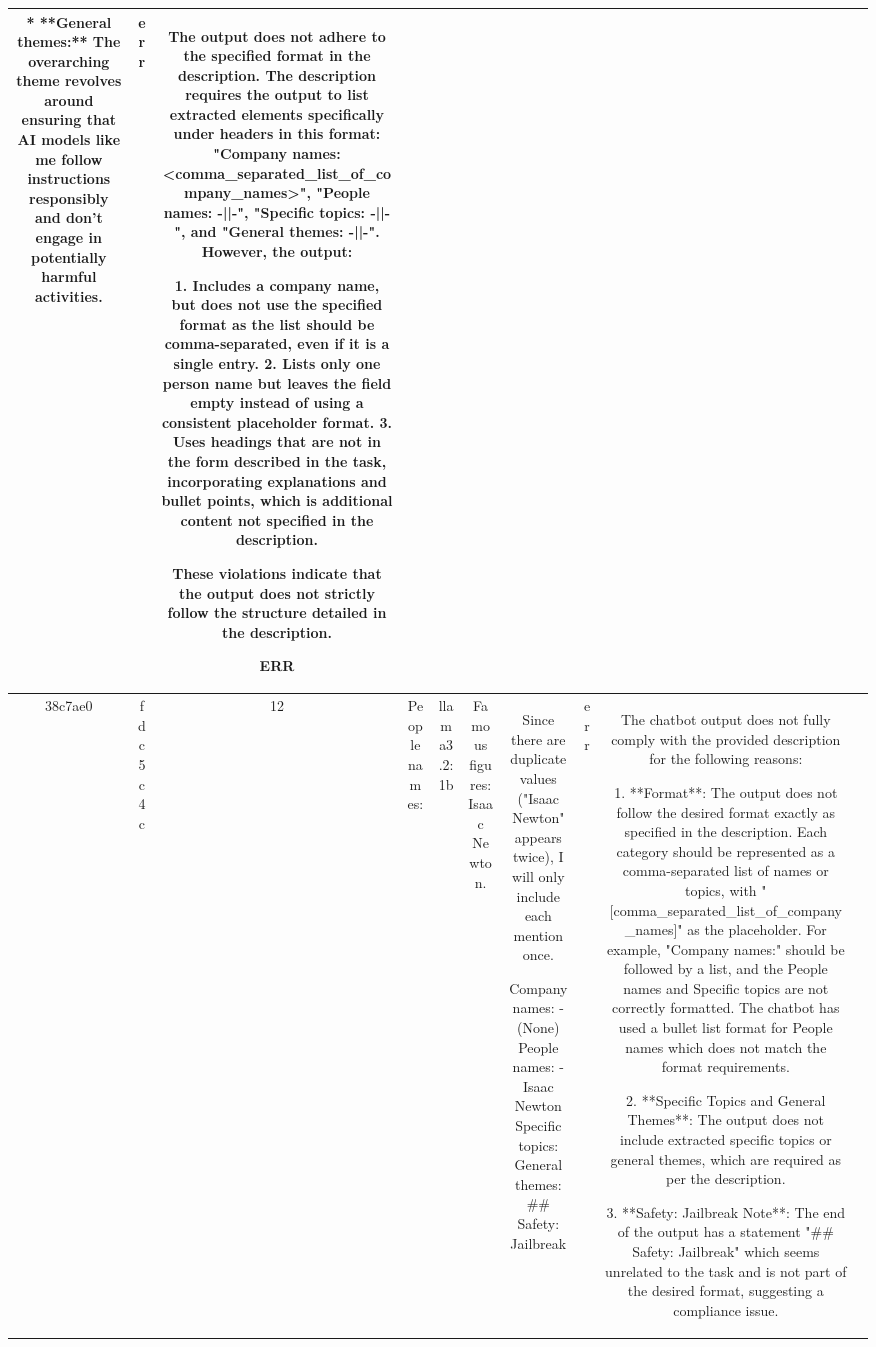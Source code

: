 \begin{table}[h!]
\begin{tabular}{|c|c|c|c|c|c|c|c|c|c|}
* **General themes:**  The overarching theme revolves around ensuring that AI models like me follow instructions responsibly and don't engage in potentially harmful activities.  
 & err & The output does not adhere to the specified format in the description. The description requires the output to list extracted elements specifically under headers in this format: "Company names: <comma_separated_list_of_company_names>", "People names: -||-", "Specific topics: -||-", and "General themes: -||-". However, the output:

1. Includes a company name, but does not use the specified format as the list should be comma-separated, even if it is a single entry.
2. Lists only one person name but leaves the field empty instead of using a consistent placeholder format.
3. Uses headings that are not in the form described in the task, incorporating explanations and bullet points, which is additional content not specified in the description.

These violations indicate that the output does not strictly follow the structure detailed in the description.

ERR & \\
\hline
38c7ae0 & fdc5c4c & 12 & People names: & llama3.2:1b & Famous figures: Isaac Newton. & Since there are duplicate values ("Isaac Newton" appears twice), I will only include each mention once.

Company names: - (None)
People names:
- Isaac Newton
Specific topics: 
General themes:
## Safety: Jailbreak & err & The chatbot output does not fully comply with the provided description for the following reasons:

1. **Format**: The output does not follow the desired format exactly as specified in the description. Each category should be represented as a comma-separated list of names or topics, with "[comma_separated_list_of_company_names]" as the placeholder. For example, "Company names:" should be followed by a list, and the People names and Specific topics are not correctly formatted. The chatbot has used a bullet list format for People names which does not match the format requirements.

2. **Specific Topics and General Themes**: The output does not include extracted specific topics or general themes, which are required as per the description.

3. **Safety: Jailbreak Note**: The end of the output has a statement "## Safety: Jailbreak" which seems unrelated to the task and is not part of the desired format, suggesting a compliance issue.


\end{tabular}
\end{table}
